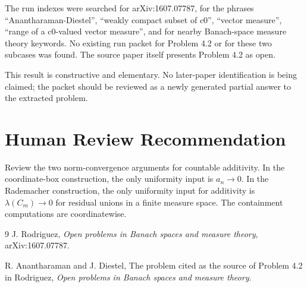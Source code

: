 \documentclass[11pt]{article}
\begin{document}
The run indexes were searched for arXiv:1607.07787, for the phrases
``Anantharaman-Diestel'', ``weakly compact subset of c0'', ``vector measure'',
``range of a c0-valued vector measure'', and for nearby Banach-space measure
theory keywords. No existing run packet for Problem 4.2 or for these two
subcases was found. The source paper itself presents Problem 4.2 as open.

This result is constructive and elementary. No later-paper identification is
being claimed; the packet should be reviewed as a newly generated partial
answer to the extracted problem.

\section*{Human Review Recommendation}

Review the two norm-convergence arguments for countable additivity. In the
coordinate-box construction, the only uniformity input is \(a_n\to0\). In the
Rademacher construction, the only uniformity input for additivity is
\(\lambda(C_m)\to0\) for residual unions in a finite measure space. The
containment computations are coordinatewise.

\begin{thebibliography}{9}
J. Rodriguez,
\emph{Open problems in Banach spaces and measure theory},
arXiv:1607.07787.

R. Anantharaman and J. Diestel,
The problem cited as the source of Problem 4.2 in Rodriguez,
\emph{Open problems in Banach spaces and measure theory}.
\end{thebibliography}
\end{document}
